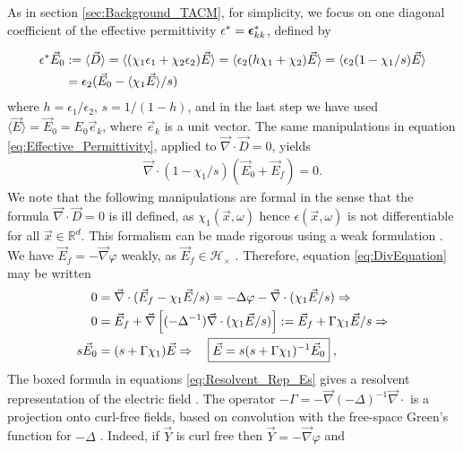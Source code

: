 \documentclass[english,12pt]{ttuthes}
\newcommand\beps{\mbox{\boldmath${\epsilon}$}}
\begin{document}
As in section \ref{sec:Background_TACM}, for simplicity, we
focus on one diagonal coefficient of the effective permittivity
$\epsilon^*=\beps^*_{kk}$, defined by
%

\begin{align}\label{eq:Effective_Permittivity}
  \epsilon^*\vec{E}_0&:= \langle\vec{D}\rangle= \langle(\chi_1\epsilon_1+\chi_2\epsilon_2)\vec{E}\rangle
              =\langle\epsilon_2(h\chi_1+\chi_2)\vec{E}\rangle
              =\langle\epsilon_2(1-\chi_1/s)\vec{E}\rangle\notag \\             
              &=\epsilon_2(\vec{E}_0-\langle\chi_1\vec{E}\rangle/s)
\end{align}
%
where $h=\epsilon_1/\epsilon_2$, $s=1/(1-h)$, and in the last step we have used
$\langle\vec{E}\rangle=\vec{E}_0=E_0\vec{e}_k$, where $\vec{e}_k$ is a
unit vector. The same manipulations in equation 
\eqref{eq:Effective_Permittivity}, applied to $\vec{\nabla}\cdot\vec{D}=0$,
yields    
%
\begin{align} \label{eq:DivEquation}
  \vec{\nabla}\cdot(1-\chi_1/s)(\vec{E}_0+\vec{E}_f)=0.
\end{align}
%
We note that the following manipulations are formal in the
sense that the formula $\vec{\nabla}\cdot\vec{D}=0$ is ill defined, as
$\chi_1(\vec{x},\omega)$ hence $\epsilon(\vec{x},\omega)$ is not differentiable for all
$\vec{x}\in\mathbb{R}^d$. This formalism can be made rigorous using a
weak formulation \cite{Golden:CMP-473,Folland:95}. We have
$\vec{E}_f=-\vec{\nabla}\varphi$ weakly, as $\vec{E}_f\in\mathscr{H}_\times$ \cite{Griffiths-1999}. 
Therefore, equation \eqref{eq:DivEquation} may be written  
%
\begin{align}\label{eq:Resolvent_Rep_Es}
  0&=\vec{\nabla}\cdot(\vec{E}_f-\chi_1\vec{E}/s)=-\Delta\varphi-\vec{\nabla}\cdot(\chi_1\vec{E}/s)\Rightarrow
  \notag\\
0&=\vec{E}_f+\vec{\nabla}\left[(-\Delta^{-1})\vec{\nabla}\cdot(\chi_1\vec{E}/s)\right]:=
\vec{E}_f+\Gamma\chi_1\vec{E}/s \Rightarrow\notag\\
s\vec{E}_0&=(s+\Gamma\chi_1)\vec{E}\Rightarrow\quad
\boxed{\vec{E}=s(s+\Gamma\chi_1)^{-1}\vec{E}_0}\;,
\end{align}
%
The boxed formula in equations \eqref{eq:Resolvent_Rep_Es} gives a
resolvent representation of the electric field \cite{Stone:64}. The
operator $-\Gamma=-\vec{\nabla}(-\Delta)^{-1}\vec{\nabla}\cdot$ is a projection onto curl-free
fields, based on convolution with the free-space Green's function for
$-\Delta$ \cite{Golden:CMP-473}. Indeed, if $\vec{Y}$ is curl free then
$\vec{Y}=-\vec{\nabla}\varphi$ and     
\end{document}
